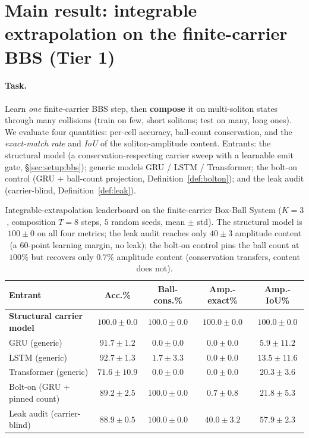 \documentclass[11pt]{article}
\theoremstyle{definition}
\theoremstyle{plain}
\begin{document}
\section{Main result: integrable extrapolation on the finite-carrier BBS (Tier 1)}\label{sec:main}

\paragraph{Task.}
Learn \emph{one} finite-carrier BBS step, then \textbf{compose} it on multi-soliton states through
many collisions (train on few, short solitons; test on many, long ones). We evaluate four quantities:
per-cell accuracy, ball-count conservation, and the \emph{exact-match rate} and \emph{IoU} of the
soliton-amplitude content. Entrants: the structural model (a conservation-respecting carrier sweep
with a learnable emit gate, \S\ref{sec:setup:bbs}); generic models GRU / LSTM / Transformer; the
bolt-on control (GRU $+$ ball-count projection, Definition~\ref{def:bolton}); and the leak audit
(carrier-blind, Definition~\ref{def:leak}).

\begin{table}[h]
\centering
\caption{Integrable-extrapolation leaderboard on the finite-carrier Box-Ball System ($K=3$,
composition $T=8$ steps, $5$ random seeds, mean $\pm$ std). The structural model is $100\pm0$ on all
four metrics; the leak audit reaches only $40\pm3$ amplitude content (a $60$-point learning margin,
no leak); the bolt-on control pins the ball count at $100\%$ but recovers only $0.7\%$ amplitude
content (conservation transfers, content does not).}
\label{tab:tier1}
\begin{tabular}{lcccc}
\toprule
\textbf{Entrant} & \textbf{Acc.\%} & \textbf{Ball-cons.\%} & \textbf{Amp.-exact\%} & \textbf{Amp.-IoU\%} \\
\midrule
\textbf{Structural carrier model} & $\mathbf{100.0\pm0.0}$ & $\mathbf{100.0\pm0.0}$ & $\mathbf{100.0\pm0.0}$ & $\mathbf{100.0\pm0.0}$ \\
GRU (generic) & $91.7\pm1.2$ & $0.0\pm0.0$ & $0.0\pm0.0$ & $5.9\pm11.2$ \\
LSTM (generic) & $92.7\pm1.3$ & $1.7\pm3.3$ & $0.0\pm0.0$ & $13.5\pm11.6$ \\
Transformer (generic) & $71.6\pm10.9$ & $0.0\pm0.0$ & $0.0\pm0.0$ & $20.3\pm3.6$ \\
Bolt-on (GRU $+$ pinned count) & $89.2\pm2.5$ & $100.0\pm0.0$ & $0.7\pm0.8$ & $21.8\pm5.3$ \\
Leak audit (carrier-blind) & $88.9\pm0.5$ & $100.0\pm0.0$ & $40.0\pm3.2$ & $57.9\pm2.3$ \\
\bottomrule
\end{tabular}
\end{table}
\end{document}
